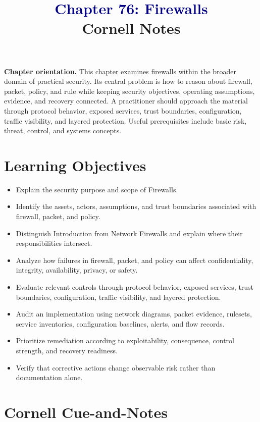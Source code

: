 \documentclass[11pt]{article}
\title{\textcolor{Navy}{Chapter 76: Firewalls}\\[2mm]\large Cornell Notes}
\author{}
\date{}
\begin{document}
\maketitle
\thispagestyle{fancy}
\vspace{-1.5em}
\begin{orientationbox}
\textbf{Chapter orientation.} This chapter examines firewalls within the broader domain of practical security. Its central problem is how to reason about firewall, packet, policy, and rule while keeping security objectives, operating assumptions, evidence, and recovery connected. A practitioner should approach the material through protocol behavior, exposed services, trust boundaries, configuration, traffic visibility, and layered protection. Useful prerequisites include basic risk, threat, control, and systems concepts.
\end{orientationbox}
\section*{Learning Objectives}
\begin{itemize}
\item Explain the security purpose and scope of Firewalls.
\item Identify the assets, actors, assumptions, and trust boundaries associated with firewall, packet, and policy.
\item Distinguish Introduction from Network Firewalls and explain where their responsibilities intersect.
\item Analyze how failures in firewall, packet, and policy can affect confidentiality, integrity, availability, privacy, or safety.
\item Evaluate relevant controls through protocol behavior, exposed services, trust boundaries, configuration, traffic visibility, and layered protection.
\item Audit an implementation using network diagrams, packet evidence, rulesets, service inventories, configuration baselines, alerts, and flow records.
\item Prioritize remediation according to exploitability, consequence, control strength, and recovery readiness.
\item Verify that corrective actions change observable risk rather than documentation alone.
\end{itemize}
\section*{Cornell Cue-and-Notes}
\end{document}
